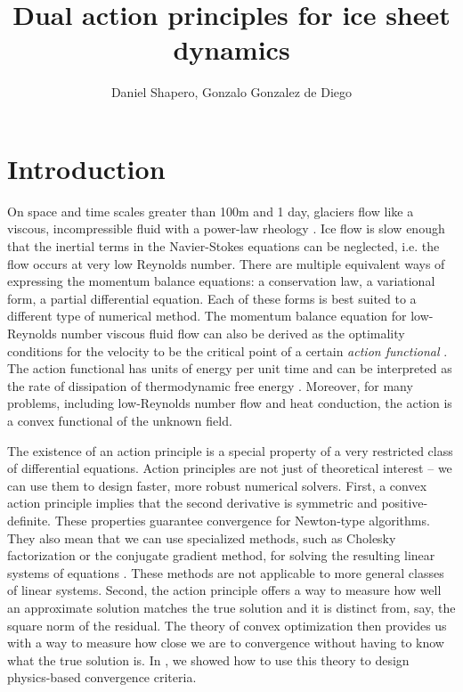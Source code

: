 \documentclass{article}
\title{Dual action principles for ice sheet dynamics}
\author{Daniel Shapero, Gonzalo Gonzalez de Diego}
\date{}
\theoremstyle{definition}
\theoremstyle{plain}
\begin{document}
\maketitle

\section{Introduction}

On space and time scales greater than 100m and 1 day, glaciers flow like a viscous, incompressible fluid with a power-law rheology \citep{greve2009dynamics}.
Ice flow is slow enough that the inertial terms in the Navier-Stokes equations can be neglected, i.e. the flow occurs at very low Reynolds number.
There are multiple equivalent ways of expressing the momentum balance equations: a conservation law, a variational form, a partial differential equation.
Each of these forms is best suited to a different type of numerical method.
The momentum balance equation for low-Reynolds number viscous fluid flow can also be derived as the optimality conditions for the velocity to be the critical point of a certain \emph{action functional} \citep{dukowicz2010consistent}.
The action functional has units of energy per unit time and can be interpreted as the rate of dissipation of thermodynamic free energy \citep{edelen1972nonlinear}.
Moreover, for many problems, including low-Reynolds number flow and heat conduction, the action is a convex functional of the unknown field.

The existence of an action principle is a special property of a very restricted class of differential equations.
Action principles are not just of theoretical interest -- we can use them to design faster, more robust numerical solvers.
First, a convex action principle implies that the second derivative is symmetric and positive-definite.
These properties guarantee convergence for Newton-type algorithms.
They also mean that we can use specialized methods, such as Cholesky factorization or the conjugate gradient method, for solving the resulting linear systems of equations \citep{nocedal2006numerical}.
These methods are not applicable to more general classes of linear systems.
Second, the action principle offers a way to measure how well an approximate solution matches the true solution and it is distinct from, say, the square norm of the residual.
The theory of convex optimization then provides us with a way to measure how close we are to convergence without having to know what the true solution is.
In \citet{shapero2021icepack}, we showed how to use this theory to design physics-based convergence criteria.
\end{document}
